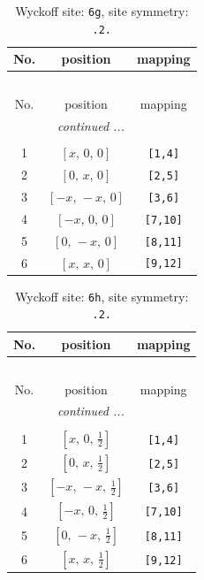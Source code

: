 \documentclass[fleqn,8pt]{jsarticle}
\begin{document}
\begin{longtable}{ccc}
\caption{Wyckoff site: {\tt 6g}, site symmetry: {\tt .2.}}
 \\
 \hline \hline
No. & position & mapping \\ \hline \endfirsthead

\multicolumn{2}{l}{\tablename\ \thetable{}} \\
 \hline \hline
No. & position & mapping \\ \hline \endhead

 \hline \hline
\multicolumn{2}{r}{\footnotesize\it continued ...} \\ \endfoot

 \hline \hline
\multicolumn{2}{r}{} \\ \endlastfoot

1 & $\left[ x,\, 0,\, 0 \right]$ & {\tt [1,4]} \\ \hline
2 & $\left[ 0,\, x,\, 0 \right]$ & {\tt [2,5]} \\ \hline
3 & $\left[ - x,\, - x,\, 0 \right]$ & {\tt [3,6]} \\ \hline
4 & $\left[ - x,\, 0,\, 0 \right]$ & {\tt [7,10]} \\ \hline
5 & $\left[ 0,\, - x,\, 0 \right]$ & {\tt [8,11]} \\ \hline
6 & $\left[ x,\, x,\, 0 \right]$ & {\tt [9,12]} \\
\end{longtable}
\renewcommand{\arraystretch}{1.2}
\begin{longtable}{ccc}
\caption{Wyckoff site: {\tt 6h}, site symmetry: {\tt .2.}}
 \\
 \hline \hline
No. & position & mapping \\ \hline \endfirsthead

\multicolumn{2}{l}{\tablename\ \thetable{}} \\
 \hline \hline
No. & position & mapping \\ \hline \endhead

 \hline \hline
\multicolumn{2}{r}{\footnotesize\it continued ...} \\ \endfoot

 \hline \hline
\multicolumn{2}{r}{} \\ \endlastfoot

1 & $\left[ x,\, 0,\, \frac{1}{2} \right]$ & {\tt [1,4]} \\ \hline
2 & $\left[ 0,\, x,\, \frac{1}{2} \right]$ & {\tt [2,5]} \\ \hline
3 & $\left[ - x,\, - x,\, \frac{1}{2} \right]$ & {\tt [3,6]} \\ \hline
4 & $\left[ - x,\, 0,\, \frac{1}{2} \right]$ & {\tt [7,10]} \\ \hline
5 & $\left[ 0,\, - x,\, \frac{1}{2} \right]$ & {\tt [8,11]} \\ \hline
6 & $\left[ x,\, x,\, \frac{1}{2} \right]$ & {\tt [9,12]} \\
\end{longtable}
\end{document}
